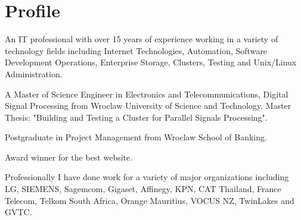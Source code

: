 \documentclass[letterpaper]{tenseconds} %
\begin{document}
\makeprofile %

\section{Profile}
\textnormal{\faInfo} An IT professional with over 15 years of experience working in a variety of technology fields including Internet Technologies, Automation, Software Development Operations, Enterprise Storage, Clusters, Testing and Unix/Linux Administration.

\textnormal{\faGraduationCap} A Master of Science Engineer in Electronics and Telecommunications, Digital Signal Processing from Wroclaw University of Science and Technology. Master Thesis: "Building and Testing a Cluster for Parallel Signals Processing".

\textnormal{\faGraduationCap} Postgraduate in Project Management from Wroclaw School of Banking.
 
\textnormal{\textcolor{materialamber}{\faTrophy}} Award winner for the best website.

Professionally I have done work for a variety of major organizations including LG, SIEMENS, Sagemcom, Gigaset, Affinegy, KPN, CAT Thailand, France Telecom, Telkom South Africa, Orange Mauritius, VOCUS NZ, TwinLakes and GVTC. \vspace{2mm}
\end{document}
